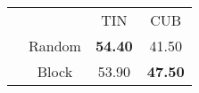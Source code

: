 
\begin{center}\vspace{-.2em}
\begin{tabular}{ c c c c }
\multicolumn{2}{c}{} & TIN & CUB \\
\shline
\multirow{2}{*}{Masking} & Random & \textbf{54.40} & 41.50 \\
& Block & 53.90 & \textbf{47.50} 
\end{tabular}\vspace{-.2em}
\end{center}